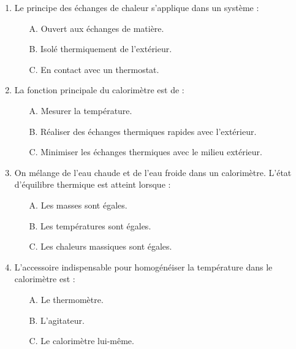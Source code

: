 \documentclass[11pt]{article}
\begin{document}
\begin{exercice}
\begin{enumerate}
    \item Le principe des échanges de chaleur s'applique dans un système :
    \begin{itemize}
        \item[A.] Ouvert aux échanges de matière.
        \item[B.] Isolé thermiquement de l'extérieur.
        \item[C.] En contact avec un thermostat.
    \end{itemize}
    \item La fonction principale du calorimètre est de :
    \begin{itemize}
        \item[A.] Mesurer la température.
        \item[B.] Réaliser des échanges thermiques rapides avec l'extérieur.
        \item[C.] Minimiser les échanges thermiques avec le milieu extérieur.
    \end{itemize}
    \item On mélange de l'eau chaude et de l'eau froide dans un calorimètre. L'état d'équilibre thermique est atteint lorsque :
    \begin{itemize}
        \item[A.] Les masses sont égales.
        \item[B.] Les températures sont égales.
        \item[C.] Les chaleurs massiques sont égales.
    \end{itemize}
    \item L'accessoire indispensable pour homogénéiser la température dans le calorimètre est :
    \begin{itemize}
        \item[A.] Le thermomètre.
        \item[B.] L'agitateur.
        \item[C.] Le calorimètre lui-même.
    \end{itemize}
\end{enumerate}
\end{exercice}
\end{document}
